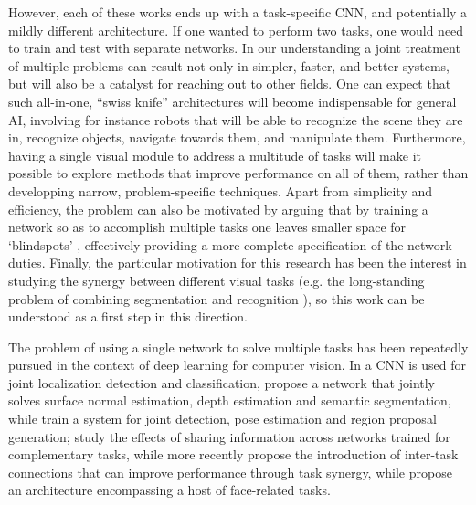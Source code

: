 \documentclass[10pt,twocolumn,letterpaper]{article}
\begin{document}
 However, each of these works ends up with a task-specific CNN, and potentially a mildly different architecture. If one wanted to perform two tasks, one would need to train and test with separate networks. In our understanding a joint treatment of multiple problems can result not only in simpler, faster, and better systems, but will also be a catalyst for reaching out to other fields. One can expect that such all-in-one, ``swiss knife'' architectures will become indispensable for general AI, involving for instance   robots that will be able to recognize the scene they are in, recognize objects, navigate towards them, and manipulate them. Furthermore, having a single visual module to address a multitude of tasks will make it  possible to explore methods that  improve performance on all of them, rather than developping narrow, problem-specific techniques. Apart from simplicity and efficiency, the problem can also be motivated  by arguing that by training a network so as to accomplish multiple tasks one leaves smaller space for `blindspots' \cite{blindspots}, effectively providing a more complete specification of the network duties. 
 Finally, the particular motivation for this research has been the interest in studying the synergy between different visual tasks (e.g. the long-standing problem of combining segmentation and recognition  \cite{Keeler90,mumf94b,BottouBL97,TCYZ03,KoMa05,KTZ05,MaireYP11}), so this work can be understood as a first step in this direction. 
	
The problem of using a single network to solve multiple tasks has  been repeatedly pursued  in the context of deep learning for computer vision. In \cite{SEZM+14} a  CNN is used for joint localization  detection and classification,  \cite{Eigen15} propose a network that jointly solves surface normal estimation, depth estimation and semantic segmentation, while  \cite{GkioxariGM15}  train a system for joint detection, pose estimation and region proposal generation; \cite{ishan} study the effects of sharing information across networks trained for complementary tasks, while
more recently \cite{BilenV16} propose the introduction of inter-task connections that can improve performance through task synergy, while \cite{RanjanPC16} propose an architecture encompassing a host of face-related tasks. 
\end{document}
